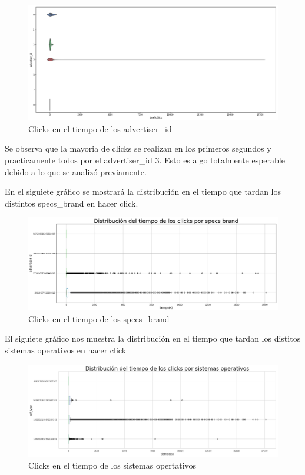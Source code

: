 \documentclass[a4paper, 12pt]{article}
\newcommand\tab[1][1cm]{\hspace*{#1}}
\begin{document}
		\FloatBarrier
		\begin{figure}[h]
			\centering
			\includegraphics[width=\textwidth]{images/clicks/clicks_advertiser_id_timeToTouch2.png}
			\caption{Clicks en el tiempo de los advertiser_id}
		\end{figure}
		\FloatBarrier

		\tab Se observa que la mayoria de clicks se realizan en los primeros segundos y practicamente todos por el advertiser_id 3. Esto es algo totalmente esperable debido a lo que se analizó previamente.

		\tab En el siguiete gráfico se mostrará la distribución en el tiempo que tardan los distintos specs_brand en hacer click.

		\FloatBarrier
		\begin{figure}[h]
			\centering
			\includegraphics[width=\textwidth]{images/clicks/clicks_specs_brand_timeToTouch.png}
			\caption{Clicks en el tiempo de los specs_brand}
		\end{figure}
		\FloatBarrier

		\tab El siguiete gráfico nos muestra la distribución en el tiempo que tardan los distitos sistemas operativos en hacer click

		\FloatBarrier
		\begin{figure}[h]
			\centering
			\includegraphics[width=\textwidth]{images/clicks/clicks_ref_type_timeToTouch.png}
			\caption{Clicks en el tiempo de los sistemas opertativos}
		\end{figure}
		\FloatBarrier
\end{document}
